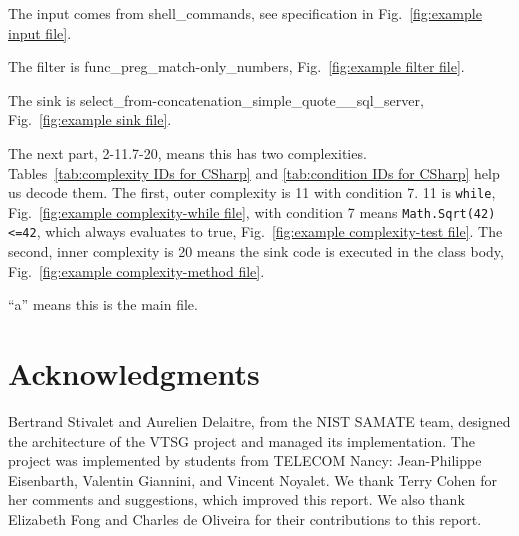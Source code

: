 \documentclass[12pt]{article}
\begin{document}
\noindent The input comes from shell\_commands, see specification in
Fig.~\ref{fig:example input file}.

\noindent The filter is func\_preg\_match-only\_numbers,
Fig.~\ref{fig:example filter file}.

\noindent The sink is select\_from-concatenation\_simple\_quote\_\_sql\_server,
Fig.~\ref{fig:example sink file}.

\noindent The next part, 2-11.7-20, means this has two complexities.
Tables~\ref{tab:complexity IDs for CSharp} and
\ref{tab:condition IDs for CSharp} help us decode them.
The first, outer complexity is 11 with condition 7. 11 is \verb|while|,
Fig.~\ref{fig:example complexity-while file}, 
with condition 7 means \verb|Math.Sqrt(42)<=42|, which always evaluates to true,
Fig.~\ref{fig:example complexity-test file}.
The second, inner complexity is 20 means the sink code is executed in the class body,
Fig.~\ref{fig:example complexity-method file}.

\noindent ``a'' means this is the main file.



\section{Acknowledgments}

Bertrand Stivalet and Aurelien Delaitre, from the NIST SAMATE team, designed the
architecture of the VTSG project and managed its implementation.  The project was
implemented by students from TELECOM Nancy: Jean-Philippe Eisenbarth, Valentin
Giannini, and Vincent Noyalet.  We thank Terry Cohen for her comments and
suggestions, which improved this report.  We also thank Elizabeth Fong and
Charles de Oliveira for their contributions to this report.
%
%
%
%
\end{document}
